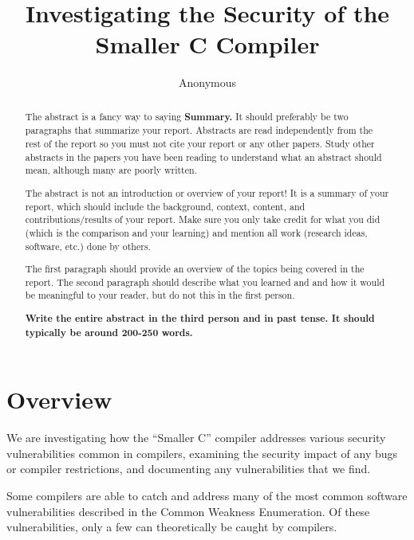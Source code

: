 \documentclass[sigconf, anonymous]{acmart}
\begin{document}
\title{Investigating the Security of the Smaller C Compiler}

\author{Anonymous}

\begin{abstract}
  The abstract is a fancy way to saying {\bf Summary.} It should
  preferably be two paragraphs that summarize your report. Abstracts
  are read independently from the rest of the report so you must not
  cite your report or any other papers. Study other abstracts in the
  papers you have been reading to understand what an abstract should
  mean, although many are poorly written.

  The abstract is not an introduction or overview of your report! It is
  a summary of your report, which should include the background,
  context, content, and contributions/results of your report. Make
  sure you only take credit for what you did (which is the comparison
  and your learning) and mention all work (research ideas, software,
  etc.) done by others.

  The first paragraph should provide an overview of the topics being
  covered in the report. The second paragraph should describe what you
  learned and and how it would be meaningful to your reader, but do
  not this in the first person.
  
  {\bf Write the entire abstract in the third person and in past
    tense. It should typically be around 200-250 words.}
\end{abstract}


\maketitle


\section{Overview}
\label{motivation}

We are investigating how the “Smaller C” compiler addresses various security vulnerabilities common in compilers, examining the security impact of any bugs or compiler restrictions, and documenting any vulnerabilities that we find.

Some compilers are able to catch and address many of the most common software vulnerabilities described in the Common Weakness Enumeration.\cite{CWE:2023} Of these vulnerabilities, only a few can theoretically be caught by compilers.
\end{document}
